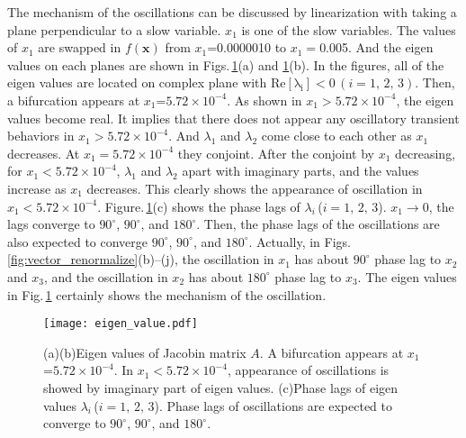\documentclass[a4paper]{article}
\newcommand{\figref}[1]{Fig.\,\ref{#1}}
\newcommand{\mfigsref}[3]{Figs.\,\ref{#1}(#2) and \ref{#1}(#3)}
\newcommand{\mfigshref}[3]{Figs.\,\ref{#1}(#2)--(#3)}
\newcommand{\imfigref}[2]{Figure.\,\ref{#1}(#2)}
\newcommand{\order}[1]{\times10^{#1}}
\renewcommand{\deg}{^{\circ}}
\begin{document}
The mechanism of the oscillations can be discussed by linearization with taking a plane perpendicular to a slow variable.
$x_1$ is one of the slow variables. 
The values of $x_1$ are swapped in $f({\bm x})$ from $x_1$=0.0000010 to $x_1=$0.005. 
 And the eigen values on each planes are shown in \mfigsref{fig:eigen_value}{a}{b}.
 In the figures, 
 all of the eigen values are located
 on complex plane with $\mathrm{Re[\lambda_i]}$$<$0\,$(i=1,\,2,\,3)$. 
 Then, a bifurcation appears at $x_1$=$5.72\order{-4}$. 
 As shown in $x_1>5.72\order{-4}$, 
 the eigen values become real. 
 It implies that 
 there does not appear any oscillatory transient behaviors in $x_1>5.72\order{-4}$. 
 And $\lambda_1$ and $\lambda_2$ come close to each other as $x_1$ decreases. 
 At $x_1=5.72\order{-4}$ they conjoint. 
 After the conjoint by $x_1$ decreasing, 
 for $x_1<5.72\order{-4}$, 
 $\lambda_1$ and $\lambda_2$ apart with imaginary parts, 
 and the values increase as $x_1$ decreases. 
 This clearly shows the appearance of oscillation in $x_1<5.72\order{-4}$. 
 \imfigref{fig:eigen_value}{c} shows the 
 phase lags of $\lambda_i$\,($i=1,\,2,\,3$). 
 $x_1\to 0$, the lags converge to $90\deg$, $90\deg$, and $180\deg$.
 Then, the phase lags of the oscillations are also expected to converge $90\deg$, $90\deg$, and $180\deg$.
 Actually, in \mfigshref{fig:vector_renormalize}{b}{j}, 
 the oscillation in $x_1$ has about $90\deg$ phase lag to $x_2$ and $x_3$, 
 and the oscillation in $x_2$ has about $180\deg$ phase lag to $x_3$. 
 The eigen values in \figref{fig:eigen_value} certainly shows the mechanism of the oscillation. 
 \begin{figure}[h]
 \centering
 \texttt{[image: eigen\_value.pdf]}
  \caption{(a)(b)Eigen values of Jacobin matrix $A$. A bifurcation appears at $x_1$=$5.72\order{-4}$.
  In $x_1<5.72\order{-4}$, appearance of oscillations is showed by imaginary part of eigen values.
  (c)Phase lags of eigen values $\lambda_i$\,($i=1,\,2,\,3$).
  Phase lags of oscillations are expected to converge to $90\deg$, $90\deg$, and $180\deg$.}
 \label{fig:eigen_value}
\end{figure}
\end{document}
